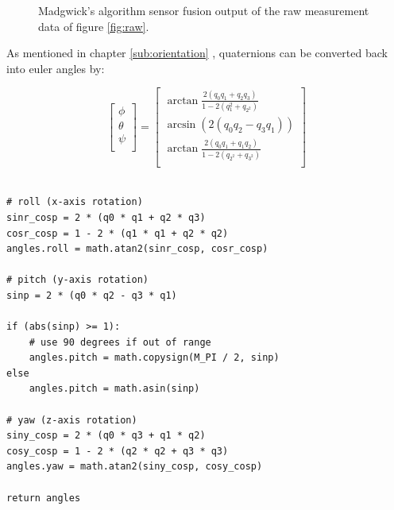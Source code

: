 
\begin{figure}[!h]
    \centering
    \resizebox{0.8\linewidth}{!}{}
    \caption{Madgwick's algorithm sensor fusion output of the raw measurement data of figure \ref{fig:raw}.}
    \label{fig:fusion_output}
\end{figure}


As mentioned in chapter \ref{sub:orientation} , quaternions can be converted back into euler angles by:

\begin{equation}
    \begin{bmatrix}
        \phi   \\
        \theta \\
        \psi   \\
    \end{bmatrix}
    =
    \begin{bmatrix}
        \arctan \frac{2(q_0q_1+q_2q_3)}{1-2(q{_1^2}+q_{2^2})} \\
        \arcsin (2(q_0q_2-q_3q_1))                            \\
        \arctan \frac{2(q_0q_1+q_1q_2)}{1-2(q_{2^2}+q_{3^2})} \\
    \end{bmatrix}
\end{equation}

\lstset{language=Python}
\begin{lstlisting}[frame=single]  % Start your code-block
    
# roll (x-axis rotation)
sinr_cosp = 2 * (q0 * q1 + q2 * q3)
cosr_cosp = 1 - 2 * (q1 * q1 + q2 * q2)
angles.roll = math.atan2(sinr_cosp, cosr_cosp)

# pitch (y-axis rotation)
sinp = 2 * (q0 * q2 - q3 * q1)

if (abs(sinp) >= 1):
    # use 90 degrees if out of range
    angles.pitch = math.copysign(M_PI / 2, sinp)
else
    angles.pitch = math.asin(sinp)

# yaw (z-axis rotation)
siny_cosp = 2 * (q0 * q3 + q1 * q2)
cosy_cosp = 1 - 2 * (q2 * q2 + q3 * q3)
angles.yaw = math.atan2(siny_cosp, cosy_cosp)

return angles
    
\end{lstlisting}

